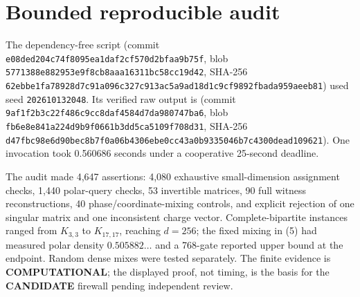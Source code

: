\documentclass[11pt]{article}
\newcommand{\COMP}{\textbf{COMPUTATIONAL}}
\newcommand{\CAND}{\textbf{CANDIDATE}}
\begin{document}
\section{Bounded reproducible audit}
The dependency-free script
(commit \texttt{e08ded204c74f8095ea1daf2cf570d2bfaa9b75f}, blob
\texttt{5771388e882953e9f8cb8aaa16311bc58cc19d42}, SHA-256
\texttt{62ebbe1fa78928d7c91a096c327c913ac5a9ad18d1c9cf9892fbada959aeeb81})
used seed \texttt{202610132048}.  Its verified raw output is
(commit \texttt{9af1f2b3c22f486c9cc8daf4584d7da980747ba6}, blob
\texttt{fb6e8e841a224d9b9f0661b3dd5ca5109f708d31}, SHA-256
\texttt{d47fbc98e6d90bec8b7f0a06b4306ebe0cc43a0b9335046b7c4300dead109621}).
One invocation took 0.560686 seconds under a cooperative 25-second deadline.

The audit made 4,647 assertions: 4,080 exhaustive small-dimension assignment
checks, 1,440 polar-query checks, 53 invertible matrices, 90 full witness
reconstructions, 40 phase/coordinate-mixing controls, and explicit rejection
of one singular matrix and one inconsistent charge vector.  Complete-bipartite
instances ranged from $K_{3,3}$ to $K_{17,17}$, reaching $d=256$; the fixed
mixing in (5) had measured polar density $0.505882\ldots$ and a 768-gate
reported upper bound at the endpoint.  Random dense mixes were tested
separately.  The finite evidence is \COMP{}; the displayed proof, not timing,
is the basis for the \CAND{} firewall pending independent review.
\end{document}
